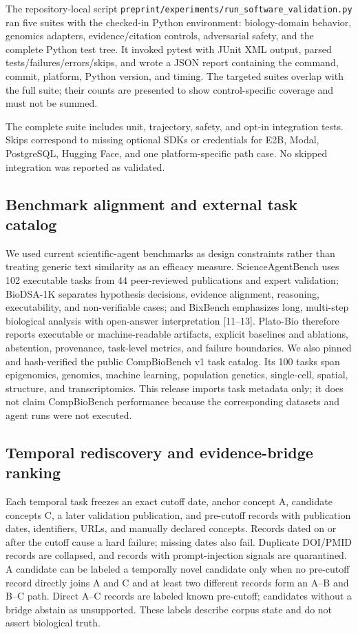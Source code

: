 \documentclass[11pt]{article}
\begin{document}
The repository-local script \nolinkurl{preprint/experiments/run_software_validation.py} ran five suites with the checked-in Python environment: biology-domain behavior, genomics adapters, evidence/citation controls, adversarial safety, and the complete Python test tree. It invoked pytest with JUnit XML output, parsed tests/failures/errors/skips, and wrote a JSON report containing the command, commit, platform, Python version, and timing. The targeted suites overlap with the full suite; their counts are presented to show control-specific coverage and must not be summed.

The complete suite includes unit, trajectory, safety, and opt-in integration tests. Skips correspond to missing optional SDKs or credentials for E2B, Modal, PostgreSQL, Hugging Face, and one platform-specific path case. No skipped integration was reported as validated.

\subsection{Benchmark alignment and external task catalog}

We used current scientific-agent benchmarks as design constraints rather than treating generic text similarity as an efficacy measure. ScienceAgentBench uses 102 executable tasks from 44 peer-reviewed publications and expert validation; BioDSA-1K separates hypothesis decisions, evidence alignment, reasoning, executability, and non-verifiable cases; and BixBench emphasizes long, multi-step biological analysis with open-answer interpretation [11--13]. Plato-Bio therefore reports executable or machine-readable artifacts, explicit baselines and ablations, abstention, provenance, task-level metrics, and failure boundaries. We also pinned and hash-verified the public CompBioBench v1 task catalog. Its 100 tasks span epigenomics, genomics, machine learning, population genetics, single-cell, spatial, structure, and transcriptomics. This release imports task metadata only; it does not claim CompBioBench performance because the corresponding datasets and agent runs were not executed.

\subsection{Temporal rediscovery and evidence-bridge ranking}

Each temporal task freezes an exact cutoff date, anchor concept A, candidate concepts C, a later validation publication, and pre-cutoff records with publication dates, identifiers, URLs, and manually declared concepts. Records dated on or after the cutoff cause a hard failure; missing dates also fail. Duplicate DOI/PMID records are collapsed, and records with prompt-injection signals are quarantined. A candidate can be labeled a temporally novel candidate only when no pre-cutoff record directly joins A and C and at least two different records form an A--B and B--C path. Direct A--C records are labeled known pre-cutoff; candidates without a bridge abstain as unsupported. These labels describe corpus state and do not assert biological truth.
\end{document}
